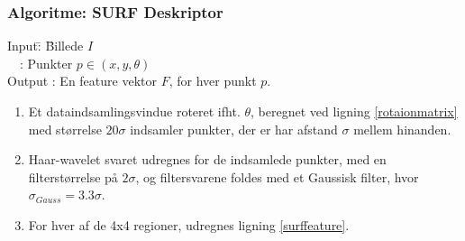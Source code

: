 \subsubsection*{Algoritme: SURF Deskriptor}
\begin{tabbing}
Input\quad \= : \= Billede $I$\\
$\text{ }$ \> : \> Punkter $p \in (x, y, \theta)$ \\
Output \text{ } \> : \> En feature vektor $F$, for hver punkt $p$.
\end{tabbing}
\begin{enumerate}
\item Et dataindsamlingsvindue roteret ifht. $\theta$, beregnet ved ligning \eqref{rotaionmatrix} med størrelse $20\sigma$ indsamler punkter, der er har afstand $\sigma$ mellem hinanden.
\item Haar-wavelet svaret udregnes for de indsamlede punkter, med en filterstørrelse på $2\sigma$, og filtersvarene foldes med et Gaussisk filter, hvor $\sigma_{Gauss} = 3.3\sigma$.
\item For hver af de 4x4 regioner, udregnes ligning \eqref{surffeature}.
\end{enumerate}